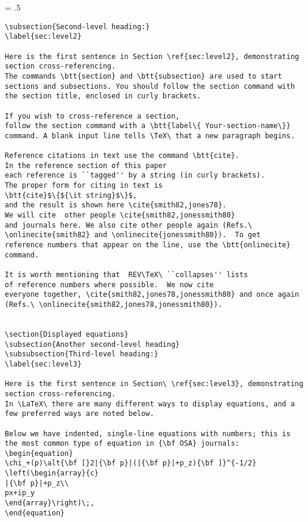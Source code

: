 \newpage
\baselineskip = .5\baselineskip  %
\begin{verbatim}
\subsection{Second-level heading:}
\label{sec:level2}

Here is the first sentence in Section \ref{sec:level2}, demonstrating
section cross-referencing.
The commands \btt{section} and \btt{subsection} are used to start
sections and subsections. You should follow the section command with
the section title, enclosed in curly brackets.

If you wish to cross-reference a section,
follow the section command with a \btt{label\{ Your-section-name\}}
command. A blank input line tells \TeX\ that a new paragraph begins.

Reference citations in text use the command \btt{cite}.
In the reference section of this paper
each reference is ``tagged'' by a string (in curly brackets).
The proper form for citing in text is
\btt{cite}$\{${\it string}$\}$,
and the result is shown here \cite{smith82,jones78}.
We will cite  other people \cite{smith82,jonessmith80}
and journals here. We also cite other people again (Refs.\
\onlinecite{smith82} and \onlinecite{jonessmith80}).  To get
reference numbers that appear on the line, use the \btt{onlinecite}
command.

It is worth mentioning that  REV\TeX\ ``collapses'' lists
of reference numbers where possible.  We now cite
everyone together, \cite{smith82,jones78,jonessmith80} and once again
(Refs.\ \onlinecite{smith82,jones78,jonessmith80}).


\section{Displayed equations}
\subsection{Another second-level heading}
\subsubsection{Third-level heading:}
\label{sec:level3}

Here is the first sentence in Section\ \ref{sec:level3}, demonstrating
section cross-referencing.
In \LaTeX\ there are many different ways to display equations, and a
few preferred ways are noted below.

Below we have indented, single-line equations with numbers; this is
the most common type of equation in {\bf OSA} journals:
\begin{equation}
\chi_+(p)\alt{\bf [}2|{\bf p}|(|{\bf p}|+p_z){\bf ]}^{-1/2}
\left(\begin{array}{c}
|{\bf p}|+p_z\\
px+ip_y
\end{array}\right)\;,
\end{equation}
\end{verbatim} \newpage
